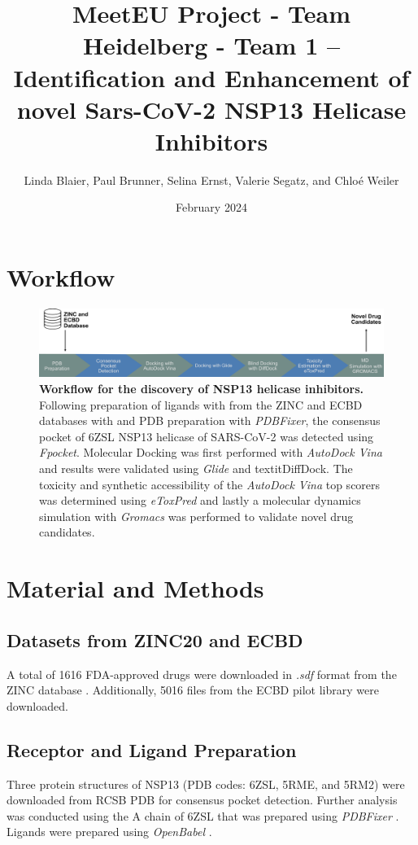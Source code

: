 \documentclass[11pt, letterpaper, titlepage]{article}
\title{MeetEU Project - Team Heidelberg - Team 1 -- \\ Identification and Enhancement of novel Sars-CoV-2 NSP13 Helicase Inhibitors}
\author{Linda Blaier, Paul Brunner, Selina Ernst, Valerie Segatz, and Chlo\'{e} Weiler}
\date{February 2024}
\begin{document}
\maketitle

\ihead{\headmark}
\cfoot{\pagemark}   %

\section{Workflow}

\begin{figure}[h]
  \centering
  \includegraphics[width=\textwidth]{Workflow_MeetEU.pdf}
  \caption*{\textbf{Workflow for the discovery of NSP13 helicase inhibitors.} Following preparation of ligands with from the ZINC and ECBD databases with \textcite{OpenBabel} and PDB preparation with \textit{PDBFixer}, the consensus pocket of 6ZSL NSP13 helicase of SARS-CoV-2 was detected using \textit{Fpocket}. Molecular Docking was first performed with \textit{AutoDock Vina} and results were validated using \textit{Glide} and textit{DiffDock}. The toxicity and synthetic accessibility of the \textit{AutoDock Vina} top scorers was determined using \textit{eToxPred} and lastly a molecular dynamics simulation with \textit{Gromacs} was performed to validate novel drug candidates.}
  \label{workflow}
\end{figure}

\setcounter{figure}{0}
\renewcommand{\thefigure}{\arabic{figure}}


\section{Material and Methods}
\subsection{Datasets from ZINC20 and ECBD}
A total of 1616 FDA-approved drugs were downloaded in \textit{.sdf} format from the ZINC database \cite{Irwin.2020}. Additionally, 5016 files from the ECBD pilot library were downloaded.

\subsection{Receptor and Ligand Preparation}
Three protein structures of NSP13 (PDB codes: 6ZSL, 5RME, and 5RM2) were downloaded from RCSB PDB for consensus pocket detection. Further analysis was conducted using the A chain of 6ZSL that was prepared using \textit{PDBFixer} \cite{Eastman_2017}. Ligands were prepared using \textit{OpenBabel} \cite{OpenBabel}.
\end{document}
